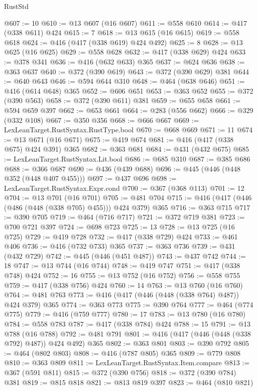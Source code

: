 \begin{lexlean}{RustStd}
\begin{coremodule}
@607 := 10
@610 := @13 @607 (@16 @607)
@611 := @558 @610
@614 := @417 (@338 @611) @424
@615 := 7
@618 := @13 @615 (@16 @615)
@619 := @558 @618
@624 := @416 (@417 (@338 @619) @424 @492)
@625 := 8
@628 := @13 @625 (@16 @625)
@629 := @558 @628
@632 := @417 (@338 @629) @424
@633 := @378 @341
@636 := @416 (@632 @633) @365
@637 := @624 @636
@638 := @363 @637
@640 := @372 (@390 @619)
@643 := @372 (@390 @629) @381
@644 := @640 @643
@646 := @594 @644 @310
@648 := @464 (@638 @646)
@651 := @416 (@614 @648) @365
@652 := @606 @651
@653 := @363 @652
@655 := @372 (@390 @563)
@658 := @372 (@390 @611) @381
@659 := @655 @658
@661 := @594 @659 @397
@662 := @653 @661
@664 := @283 (@556 @662)
@666 := @329 (@332 @108)
@667 := @350 @356
@668 := @666 @667
@669 := LexLeanTarget.RustSyntax.RustType.bool
@670 := @668 @669
@671 := 11
@674 := @13 @671 (@16 @671)
@675 := @419 @674
@681 := @416 (@417 (@338 @675) @424 @391) @365
@682 := @363 @681
@684 := @431 (@432 @675)
@685 := LexLeanTarget.RustSyntax.Lit.bool
@686 := @685 @310
@687 := @385 @686
@688 := @366 @687
@690 := @436 (@439 @688)
@696 := @445 (@446 (@448 @352 (@448 @407 @455)))
@697 := @437 @696
@698 := LexLeanTarget.RustSyntax.Expr.cond
@700 := @367 (@368 @113)
@701 := 12
@704 := @13 @701 (@16 @701)
@705 := @481 @704
@715 := @416 (@417 (@446 (@486 (@448 (@338 @705) @455))) @424 @379) @365
@716 := @363 @715
@717 := @390 @705
@719 := @464 (@716 @717)
@721 := @372 @719 @381
@723 := @700 @721 @397
@724 := @698 @723
@725 := 13
@728 := @13 @725 (@16 @725)
@729 := @419 @728
@732 := @417 (@338 @729) @424
@733 := @461 @406
@736 := @416 (@732 @733) @365
@737 := @363 @736
@739 := @431 (@432 @729)
@742 := @445 (@446 (@451 @487))
@743 := @437 @742
@744 := 18
@747 := @13 @744 (@16 @744)
@748 := @419 @747
@751 := @417 (@338 @748) @424
@752 := 16
@755 := @13 @752 (@16 @752)
@756 := @558 @755
@759 := @417 (@338 @756) @424
@760 := 14
@763 := @13 @760 (@16 @760)
@764 := @481 @763
@773 := @416 (@417 (@446 (@448 (@338 @764) @487)) @424 @379) @365
@774 := @363 @773
@775 := @390 @764
@777 := @464 (@774 @775)
@779 := @416 (@759 @777)
@780 := 17
@783 := @13 @780 (@16 @780)
@784 := @558 @783
@787 := @417 (@338 @784) @424
@788 := 15
@791 := @13 @788 (@16 @788)
@792 := @481 @791
@801 := @416 (@417 (@446 (@448 (@338 @792) @487)) @424 @492) @365
@802 := @363 @801
@803 := @390 @792
@805 := @464 (@802 @803)
@808 := @416 (@787 @805) @365
@809 := @779 @808
@810 := @363 @809
@811 := LexLeanTarget.RustSyntax.Item.compare
@813 := @367 (@591 @811)
@815 := @372 (@390 @756)
@818 := @372 (@390 @784) @381
@819 := @815 @818
@821 := @813 @819 @397
@823 := @464 (@810 @821)

\end{coremodule}
\end{lexlean}

